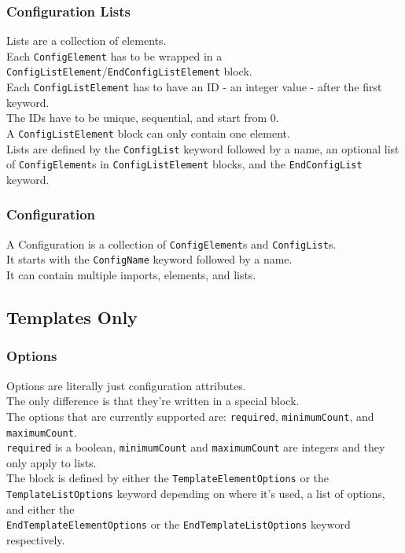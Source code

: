 \documentclass[12pt]{article}
\begin{document}
    \subsubsection{Configuration Lists}
    Lists are a collection of elements. \\
    Each \texttt{ConfigElement} has to be wrapped in a \texttt{ConfigListElement}/\texttt{EndConfigListElement} block. \\
    Each \texttt{ConfigListElement} has to have an ID - an integer value - after the first keyword. \\
    The IDs have to be unique, sequential, and start from 0. \\
    A \texttt{ConfigListElement} block can only contain one element. \\
    Lists are defined by the \texttt{ConfigList} keyword followed by a name, an optional list of \texttt{ConfigElement}s in \texttt{ConfigListElement} blocks, and the \texttt{EndConfigList} keyword.

    \subsubsection{Configuration}
    A Configuration is a collection of \texttt{ConfigElement}s and \texttt{ConfigList}s. \\
    It starts with the \texttt{ConfigName} keyword followed by a name. \\
    It can contain multiple imports, elements, and lists.

    \newpage

    \subsection{Templates Only}

    \subsubsection{Options}
    Options are literally just configuration attributes. \\
    The only difference is that they're written in a special block. \\
    The options that are currently supported are: \texttt{required}, \texttt{minimumCount}, and \texttt{maximumCount}. \\
    \texttt{required} is a boolean, \texttt{minimumCount} and \texttt{maximumCount} are integers and they only apply to lists. \\
    The block is defined by either the \texttt{TemplateElementOptions} or the \texttt{TemplateListOptions} keyword depending on where it's used, a list of options, and either the \\ \texttt{EndTemplateElementOptions} or the \texttt{EndTemplateListOptions} keyword respectively.
\end{document}
